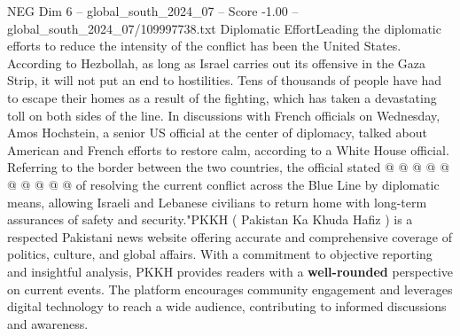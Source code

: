 \begin{textsample}{NEG Dim 6 – global\_south\_2024\_07 – Score -1.00 – global\_south\_2024\_07/109997738.txt}
Diplomatic EffortLeading the diplomatic efforts to reduce the intensity of the conflict has been the United States.
According to Hezbollah, as long as Israel carries out its offensive in the Gaza Strip, it will not put an end to hostilities.
Tens of thousands of people have had to escape their homes as a result of the fighting, which has taken a devastating toll on both sides of the line.
In discussions with French officials on Wednesday, Amos Hochstein, a senior US official at the center of diplomacy, talked about American and French efforts to restore calm, according to a White House official.
Referring to the border between the two countries, the official stated @ @ @ @ @ @ @ @ @ @ of resolving the current conflict across the Blue Line by diplomatic means, allowing Israeli and Lebanese civilians to return home with long-term assurances of safety and security."PKKH ( Pakistan Ka Khuda Hafiz ) is a respected Pakistani news website offering accurate and comprehensive coverage of politics, culture, and global affairs.
With a commitment to objective reporting and insightful analysis, PKKH provides readers with a \textbf{well-rounded} perspective on current events.
The platform encourages community engagement and leverages digital technology to reach a wide audience, contributing to informed discussions and awareness.

\end{textsample}
